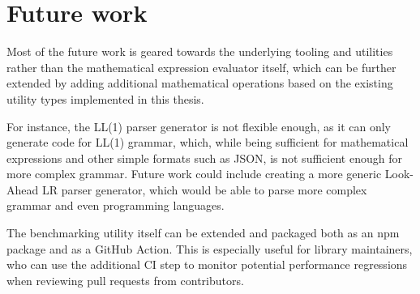 \section{Future work}

Most of the future work is geared towards the underlying tooling and utilities rather than the mathematical expression evaluator itself, which can be further extended by adding additional mathematical operations based on the existing utility types implemented in this thesis.

For instance, the LL(1) parser generator is not flexible enough, as it can only generate code for LL(1) grammar, which, while being sufficient for mathematical expressions and other simple formats such as JSON, is not sufficient enough for more complex grammar. Future work could include creating a more generic Look-Ahead LR parser generator, which would be able to parse more complex grammar and even programming languages.

The benchmarking utility itself can be extended and packaged both as an \acrshort{npm} package and as a GitHub Action. This is especially useful for library maintainers, who can use the additional CI step to monitor potential performance regressions when reviewing pull requests from contributors.

